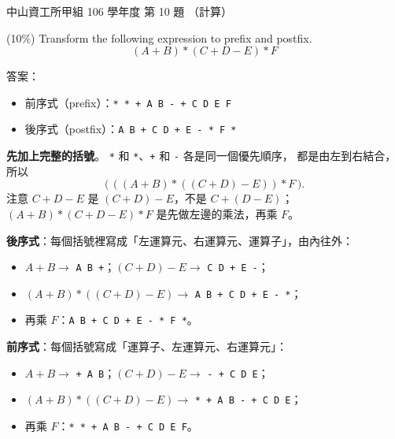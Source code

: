\begin{pastexam}[label={px:nsysu-106-osds-05}]{中山資工所甲組 106 學年度 第 10 題}
（計算）

(10\%) Transform the following expression to prefix and postfix.
\[
(A+B)*(C+D-E)*F
\]
\end{pastexam}

\begin{pastsoln}
答案：
\begin{itemize}
\item 前序式（prefix）：\texttt{* * + A B - + C D E F}
\item 後序式（postfix）：\texttt{A B + C D + E - * F *}
\end{itemize}

\textbf{先加上完整的括號}。 \texttt{*} 和 \texttt{*}、\texttt{+} 和 \texttt{-} 各是同一個優先順序，
都是由左到右結合，所以
\[
\bigl(\,((A + B) * ((C + D) - E)) * F\,\bigr).
\]
注意 $C + D - E$ 是 $(C + D) - E$，不是 $C + (D - E)$；$(A+B)*(C+D-E)*F$ 是先做左邊的乘法，再乘 $F$。

\textbf{後序式}：每個括號裡寫成「左運算元、右運算元、運算子」，由內往外：
\begin{itemize}
\item $A + B \to$ \texttt{A B +}；$(C + D) - E \to$ \texttt{C D + E -}；
\item $(A + B) * ((C + D) - E) \to$ \texttt{A B + C D + E - *}；
\item 再乘 $F$：\texttt{A B + C D + E - * F *}。
\end{itemize}

\textbf{前序式}：每個括號寫成「運算子、左運算元、右運算元」：
\begin{itemize}
\item $A + B \to$ \texttt{+ A B}；$(C + D) - E \to$ \texttt{- + C D E}；
\item $(A + B) * ((C + D) - E) \to$ \texttt{* + A B - + C D E}；
\item 再乘 $F$：\texttt{* * + A B - + C D E F}。
\end{itemize}


\end{pastsoln}
